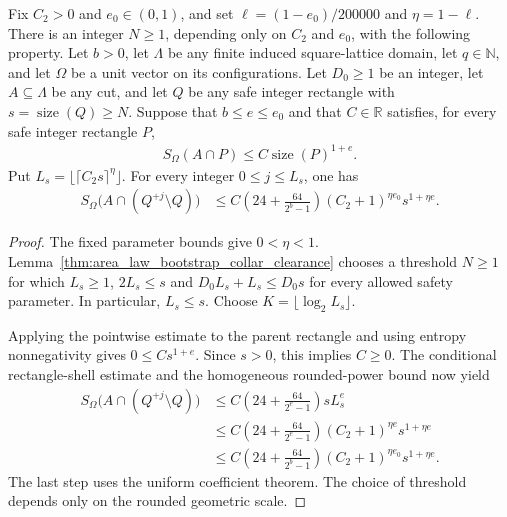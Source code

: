 \begin{lemma}
    \label{thm:area_law_uniform_rounded_shell_entropy}
    \leanok
    Fix $C_2>0$ and $e_0\in(0,1)$, and set
    $\ell=(1-e_0)/200000$ and $\eta=1-\ell$. There is an integer
    $N\ge1$, depending only on $C_2$ and $e_0$, with the following
    property. Let $b>0$, let $\Lambda$ be any finite induced
    square-lattice domain, let $q\in\mathbb N$, and let $\Omega$
    be a unit vector on its configurations. Let $D_0\ge1$ be an
    integer, let $A\subseteq\Lambda$ be any cut, and let $Q$ be any
    safe integer rectangle with $s=\operatorname{size}(Q)\ge N$.
    Suppose that $b\le e\le e_0$ and that $C\in\mathbb R$ satisfies,
    for every safe integer rectangle $P$,
    \begin{align}
        S_\Omega(A\cap P)\le C\operatorname{size}(P)^{1+e}.
    \end{align}
    Put $L_s=\lfloor\lceil C_2s\rceil^\eta\rfloor$. For every
    integer $0\le j\le L_s$, one has
    \begin{align}
        S_\Omega\bigl(A\cap(Q^{+j}\setminus Q)\bigr)
         & \le C\left(24+\frac{64}{2^b-1}\right)
        (C_2+1)^{\eta e_0}s^{1+\eta e}.
    \end{align}
\end{lemma}
\begin{proof}
    \leanok
    The fixed parameter bounds give $0<\eta<1$. Lemma~\ref{thm:area_law_bootstrap_collar_clearance} chooses
    a threshold $N\ge1$ for which $L_s\ge1$, $2L_s\le s$ and
    $D_0L_s+L_s\le D_0s$ for every allowed safety parameter.
    In particular, $L_s\le s$. Choose $K=\lfloor\log_2L_s\rfloor$.

    Applying the pointwise estimate to the parent rectangle and using
    entropy nonnegativity gives $0\le Cs^{1+e}$. Since $s>0$, this
    implies $C\ge0$. The conditional rectangle-shell estimate and the
    homogeneous rounded-power bound now yield
    \begin{align}
        S_\Omega\bigl(A\cap(Q^{+j}\setminus Q)\bigr)
         & \le C\left(24+\frac{64}{2^e-1}\right)sL_s^e \\
         & \le C\left(24+\frac{64}{2^e-1}\right)
        (C_2+1)^{\eta e}s^{1+\eta e}                   \\
         & \le C\left(24+\frac{64}{2^b-1}\right)
        (C_2+1)^{\eta e_0}s^{1+\eta e}.
    \end{align}
    The last step uses the uniform coefficient theorem. The choice of
    threshold depends only on the rounded geometric scale.
\end{proof}

